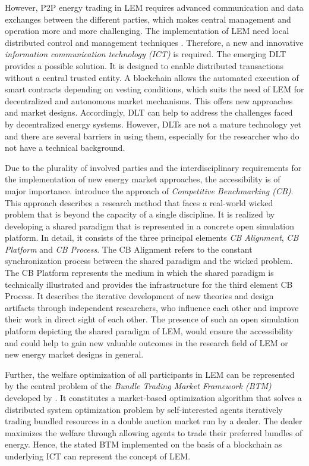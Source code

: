 However, P2P energy trading in LEM requires advanced communication and data exchanges between the different parties, 
which makes central management and operation more and more challenging. The implementation of LEM need local 
distributed control and management techniques . 
Therefore, a new and innovative \textit{information communication technology (ICT)} is required.  
The emerging DLT provides a possible solution. 
It is designed to enable distributed transactions without a central trusted entity. 
A blockchain allows the automated execution of smart contracts depending 
on vesting conditions, which suits the need of LEM for decentralized and autonomous market mechanisms. 
This offers new approaches and market designs. Accordingly, DLT can help to address the challenges 
faced by decentralized energy systems. However, DLTs are not a mature technology yet and 
there are several barriers in using them, especially for the researcher who do not have a technical background. 

Due to the plurality of involved parties and the interdisciplinary requirements for the 
implementation of new energy market approaches, the accessibility is of major importance.
 introduce the approach of \textit{Competitive Benchmarking (CB)}. 
This approach describes a research method that faces a real-world wicked problem that is beyond the capacity of a single discipline. 
It is realized by developing a shared paradigm that is represented in a concrete open simulation platform. 
In detail, it consists of the three principal elements \textit{CB Alignment}, \textit{CB Platform} and \textit{CB Process}. 
The CB Alignment refers to the constant synchronization process between the shared paradigm and the wicked problem. 
The CB Platform represents the medium in which the shared paradigm is technically illustrated
and provides the infrastructure for the third element CB Process. 
It describes the iterative development of new theories and design artifacts through independent researchers, 
who influence each other and improve their work in direct sight of each other.
The presence of such an open simulation platform depicting the shared paradigm of LEM, 
would ensure the accessibility and could help to gain new valuable outcomes in the research field 
of LEM or new energy market designs in general.

Further, the welfare optimization of all participants in LEM can be represented by the 
central problem of the \textit{Bundle Trading Market Framework (BTM)} developed by .
It constitutes a market-based optimization algorithm
that solves a distributed system optimization problem by self-interested agents iteratively 
trading bundled resources in a double auction market run by a dealer.
The dealer maximizes the welfare through allowing agents 
to trade their preferred bundles of energy. Hence, the stated BTM implemented on the basis of a 
blockchain as underlying ICT can represent the concept of LEM.

